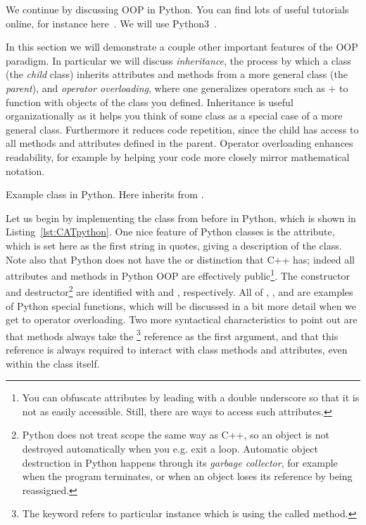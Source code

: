We continue by discussing OOP in Python. 
You can find lots of useful
tutorials online, for instance here~\cite{pythonOOP}. We will use
Python3~\cite{python3}.

In this section we will demonstrate
a couple other important features of the OOP paradigm. In particular we will
discuss {\it inheritance}, the process by which a
class (the {\it child} class) inherits attributes and methods
from a more general class (the {\it parent}), and
{\it operator overloading},  where one generalizes 
operators such as $+$ to function with objects of the class you defined.
Inheritance is useful organizationally as it helps you think of some class
as a special case of a more general class. Furthermore it reduces code
repetition, since the child has access to all methods and attributes defined in
the parent. Operator overloading enhances readability, for example by
helping your code more closely mirror mathematical notation.

\begin{code*}
\caption{Example  class in Python. Here 
inherits from .}
\label{lst:CATpython}
\end{code*}

Let us begin by implementing the  class from before in Python,
which is shown in Listing~\ref{lst:CATpython}. One nice feature of Python classes
is the  attribute, which is set here as the first string
in quotes, giving a description of the class. Note also that Python
does not have the  or  distinction that
C++ has; indeed all attributes and methods in Python OOP are effectively 
public\footnote{You can obfuscate attributes by leading with a double 
underscore \ff{\_\_} so that it is not as easily accessible. Still, there 
are ways to access such attributes.}.
The constructor and destructor\footnote{Python does not treat scope the same
way as C++, so an object is not destroyed automatically when you e.g.
exit a  loop. Automatic object destruction in Python 
happens through 
its {\it garbage collector}, for example when the program terminates,
or when an object loses its reference by being reassigned.} are identified with
 and , respectively. All of
, , and  
are examples of
Python special functions, which will be discussed in a bit more detail
when we get to operator overloading. 
Two more syntactical characteristics 
to point out are that methods always take the \footnote{The
 keyword refers to particular instance which is using
the called method.} reference as 
the first argument, and that this reference is always required to
interact with class methods and attributes, even within the class itself.

